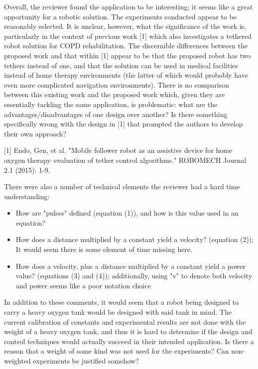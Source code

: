 \documentclass[journal,onecolumn,12pt]{IEEEtran}
\begin{document}
\vspace{2em}

Overall, the reviewer found the application to be interesting; it seems like a great opportunity for a robotic solution. The experiments conducted appear to be reasonably selected. It is unclear, however, what the significance of the work is, particularly in the context of previous work [1] which also investigates a tethered robot solution for COPD rehabilitation. The discernible differences between the proposed work and that within [1] appear to be that the proposed robot has two tethers instead of one, and that the solution can be used in medical facilities instead of home therapy environments (the latter of which would probably have even more complicated navigation environments). There is no comparison between this existing work and the proposed work which, given they are essentially tackling the same application, is problematic: what are the advantages/disadvantages of one design over another? Is there something specifically wrong with the design in [1] that prompted the authors to develop their own approach?

\vspace{2em}

[1]  Endo, Gen, et al. "Mobile follower robot as an assistive device for home oxygen therapy–evaluation of tether control algorithms." ROBOMECH Journal 2.1 (2015): 1-9.

\vspace{2em}


There were also a number of technical elements the reviewer had a hard time understanding:
\begin{itemize}
\item How are "pulses" defined (equation (1)), and how is this value used in an equation?
\item How does a distance multiplied by a constant yield a velocity? (equation (2)); It would seem there is some element of time missing here.  
\item How does a velocity, plus a distance multiplied by a constant yield a power value? (equations (3) and (4)); additionally, using "v" to denote both velocity and power seems like a poor notation choice
\end{itemize}

\vspace{2em}

In addition to these comments, it would seem that a robot being designed to carry a heavy oxygen tank would be designed with said tank in mind. The current calibration of constants and experimental results are not done with the weight of a heavy oxygen tank, and thus it is hard to determine if the design and control techniques would actually succeed in their intended application. Is there a reason that a weight of some kind was not used for the experiments? Can non-weighted experiments be justified somehow?
\end{document}
